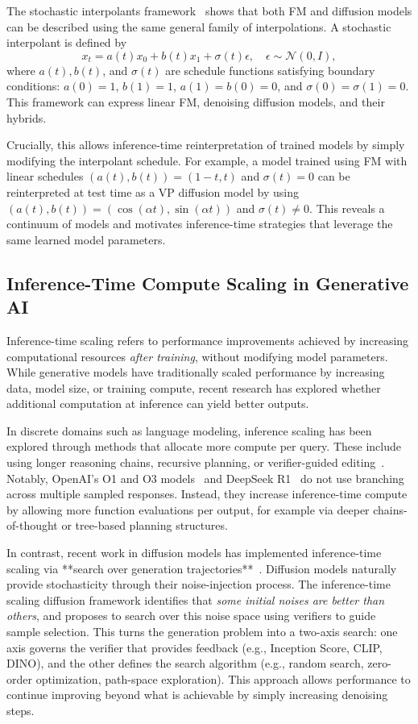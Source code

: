 \documentclass{article}
\begin{document}
The stochastic interpolants framework~\cite{ma2024sit} shows that both FM and diffusion models can be described using the same general family of interpolations. A stochastic interpolant is defined by
\[
x_t = a(t) x_0 + b(t) x_1 + \sigma(t) \epsilon, \quad \epsilon \sim \mathcal{N}(0, I),
\]
where \(a(t), b(t)\), and \(\sigma(t)\) are schedule functions satisfying boundary conditions: \(a(0) = 1\), \(b(1) = 1\), \(a(1) = b(0) = 0\), and \(\sigma(0) = \sigma(1) = 0\). This framework can express linear FM, denoising diffusion models, and their hybrids.

Crucially, this allows inference-time reinterpretation of trained models by simply modifying the interpolant schedule. For example, a model trained using FM with linear schedules \((a(t), b(t)) = (1 - t, t)\) and \(\sigma(t) = 0\) can be reinterpreted at test time as a VP diffusion model by using \((a(t), b(t)) = (\cos(\alpha t), \sin(\alpha t))\) and \(\sigma(t) \neq 0\). This reveals a continuum of models and motivates inference-time strategies that leverage the same learned model parameters.

\subsection{Inference-Time Compute Scaling in Generative AI}

Inference-time scaling refers to performance improvements achieved by increasing computational resources \emph{after training}, without modifying model parameters. While generative models have traditionally scaled performance by increasing data, model size, or training compute, recent research has explored whether additional computation at inference can yield better outputs.

In discrete domains such as language modeling, inference scaling has been explored through methods that allocate more compute per query. These include using longer reasoning chains, recursive planning, or verifier-guided editing~\cite{gandhi2024sos, cobbe2021verifiers, lightman2023verify, brown2024llmmonkeys}. Notably, OpenAI's O1 and O3 models~\cite{openai2024o1} and DeepSeek R1~\cite{deepseek2024r1} do not use branching across multiple sampled responses. Instead, they increase inference-time compute by allowing more function evaluations per output, for example via deeper chains-of-thought or tree-based planning structures.

In contrast, recent work in diffusion models has implemented inference-time scaling via **search over generation trajectories**~\cite{ma2025diffits}. Diffusion models naturally provide stochasticity through their noise-injection process. The inference-time scaling diffusion framework identifies that \emph{some initial noises are better than others}, and proposes to search over this noise space using verifiers to guide sample selection. This turns the generation problem into a two-axis search: one axis governs the verifier that provides feedback (e.g., Inception Score, CLIP, DINO), and the other defines the search algorithm (e.g., random search, zero-order optimization, path-space exploration). This approach allows performance to continue improving beyond what is achievable by simply increasing denoising steps.
\end{document}
